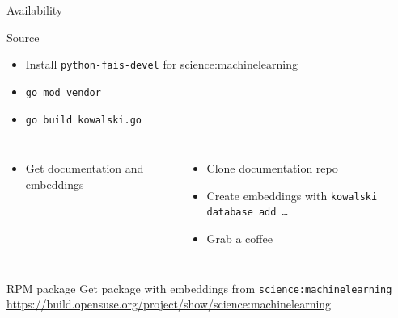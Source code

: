 \documentclass[aspectratio=169]{beamer}
\begin{document}
\begin{frame}{Availability}
\begin{block}{Source}
\begin{itemize}
  \item Install \texttt{python-fais-devel} for {science:machinelearning}
  \item \texttt{go mod vendor}
  \item \texttt{go build kowalski.go}
\end{itemize}
\begin{columns}
\begin{itemize}
  \item Get documentation and embeddings
\end{itemize}
\begin{itemize}
  \item Clone documentation repo
  \item Create embeddings with \texttt{kowalski database add \dots}
  \item Grab a coffee
\end{itemize}
\end{columns}
\end{block}
\begin{block}{RPM package}
  Get package with embeddings from \texttt{science:machinelearning}\\
  \href{https://build.opensuse.org/project/show/science:machinelearning}{https://build.opensuse.org/project/show/science:machinelearning}
\end{block}
\end{frame}
\end{document}
